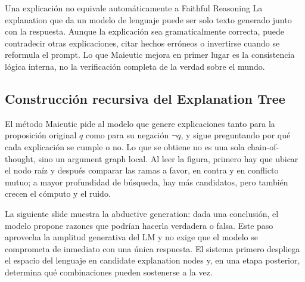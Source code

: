 \begin{warningbox}{Una explicación no equivale automáticamente a Faithful Reasoning}
La explanation que da un modelo de lenguaje puede ser solo texto generado junto con la respuesta. Aunque la explicación sea gramaticalmente correcta, puede contradecir otras explicaciones, citar hechos erróneos o invertirse cuando se reformula el prompt. Lo que Maieutic mejora en primer lugar es la consistencia lógica interna, no la verificación completa de la verdad sobre el mundo.
\end{warningbox}


\subsection{Construcción recursiva del Explanation Tree}

El método Maieutic pide al modelo que genere explicaciones tanto para la proposición original $q$ como para su negación $\neg q$, y sigue preguntando por qué cada explicación se cumple o no. Lo que se obtiene no es una sola chain-of-thought, sino un argument graph local. Al leer la figura, primero hay que ubicar el nodo raíz y después comparar las ramas a favor, en contra y en conflicto mutuo; a mayor profundidad de búsqueda, hay más candidatos, pero también crecen el cómputo y el ruido.


La siguiente slide muestra la abductive generation: dada una conclusión, el modelo propone razones que podrían hacerla verdadera o falsa. Este paso aprovecha la amplitud generativa del LM y no exige que el modelo se comprometa de inmediato con una única respuesta. El sistema primero despliega el espacio del lenguaje en candidate explanation nodes y, en una etapa posterior, determina qué combinaciones pueden sostenerse a la vez.


